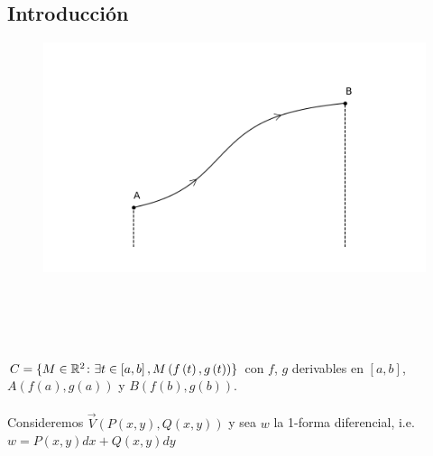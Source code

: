 \documentclass{report}
\begin{document}
  \subsection*{Introducción}
    \vspace{-0.5cm}
    \begin{figure}
      \includegraphics[width=.4\textwidth]{integraldelinea.png}
    \end{figure}
    \hfill{} \\ \\ \\ \\
    \noindent$C=\{M\in\mathbb{R}^2\colon\exists t\in\left[a,b\right],M\left(f\left(t\right),
    g\left(t\right)\right)\}$ con $f$, $g$ derivables en $\left[a,b\right]$, $A\left(f
    \left(a\right),g\left(a\right)\right)$ y $B\left(f\left(b\right),g\left(b\right)
    \right)$.\\ \\Consideremos $\vec{V}\left(P\left(x,y\right),Q\left(x,y\right)
    \right)$ y sea $w$ la 1-forma diferencial, i.e. $w=P\left(x,y\right)dx + Q\left(x,y
    \right)dy$\\
\end{document}
